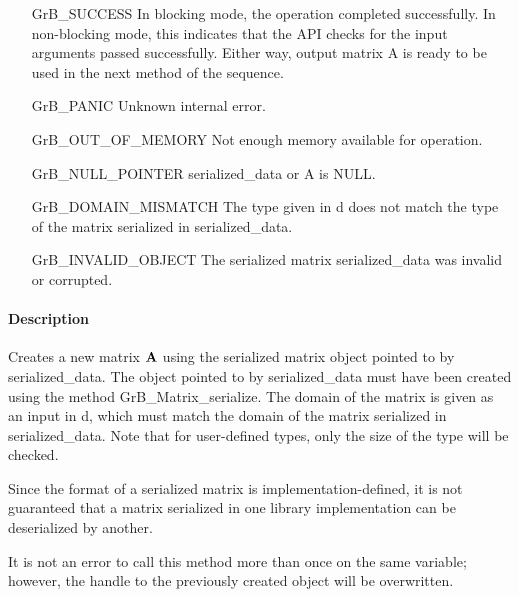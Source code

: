 \begin{itemize}[leftmargin=2.3in]
    \item[{\sf GrB\_SUCCESS}]         In blocking mode, the operation completed
    successfully. In non-blocking mode, this indicates that the API checks 
    for the input arguments passed successfully. Either way, output matrix 
    {\sf A} is ready to be used in the next method of the sequence.

    \item[{\sf GrB\_PANIC}]           Unknown internal error.
    
    \item[{\sf GrB\_OUT\_OF\_MEMORY}] Not enough memory available for operation.
    
    \item[{\sf GrB\_NULL\_POINTER}]  {\sf serialized\_data} or {\sf A} is {\sf NULL}.

    \item[{\sf GrB\_DOMAIN\_MISMATCH}]  The type given in {\sf d} does not match the type of the matrix serialized in {\sf serialized\_data}.

    \item[{\sf GrB\_INVALID\_OBJECT}]  The serialized matrix {\sf serialized\_data} was invalid or corrupted.
\end{itemize}

\paragraph{Description}

Creates a new matrix ${\bf A}$ using the serialized matrix object pointed to
by {\sf serialized\_data}.  The object pointed to by {\sf serialized\_data}
must have been created using the method {\sf GrB\_Matrix\_serialize}.  The domain
of the matrix is given as an input in {\sf d}, which must match the domain of the
matrix serialized in {\sf serialized\_data}.  Note that for user-defined types,
only the size of the type will be checked.

Since the format of a serialized matrix is implementation-defined, it is not
guaranteed that a matrix serialized in one library implementation can be
deserialized by another.

It is not an error to call this method more than once on the same variable;  
however, the handle to the previously created object will be overwritten. 


